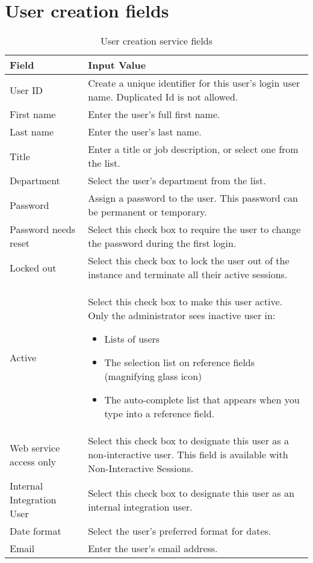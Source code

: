 \section{User creation fields}{} \label{app:userCreationFields}

\begin{table}[H]
\centering
\caption{User creation service fields}
\begin{tabular}{|p{3cm}|p{12cm}|}
\hline
Field & Input Value \\ 
\hline
User ID & Create a unique identifier for this user's login user name. Duplicated Id is not allowed. \\ 
\hline
First name & Enter the user's full first name. \\ 
\hline
Last name & Enter the user's last name. \\ 
\hline
Title & Enter a title or job description, or select one from the list. \\ 
\hline
Department & Select the user's department from the list. \\ 
\hline
Password & Assign a password to the user. This password can be permanent or temporary. \\ 
\hline
Password needs reset & Select this check box to require the user to change the password during the first login. \\ 
\hline
Locked out & Select this check box to lock the user out of the instance and terminate all their active sessions. \\ 
\hline
Active & Select this check box to make this user active. Only the administrator sees inactive user in: 
\begin{itemize}
\item Lists of users 
\item The selection list on reference fields (magnifying glass icon) 
\item The auto-complete list that appears when you type into a reference field.
\end{itemize} \\ 
\hline
Web service access only & Select this check box to designate this user as a non-interactive user. This field is available with Non-Interactive Sessions. \\ \hline
Internal Integration User & Select this check box to designate this user as an internal integration user. \\ 
\hline
Date format & Select the user's preferred format for dates. \\ 
\hline
Email & Enter the user's email address. \\ 

\end{tabular}
\end{table}
